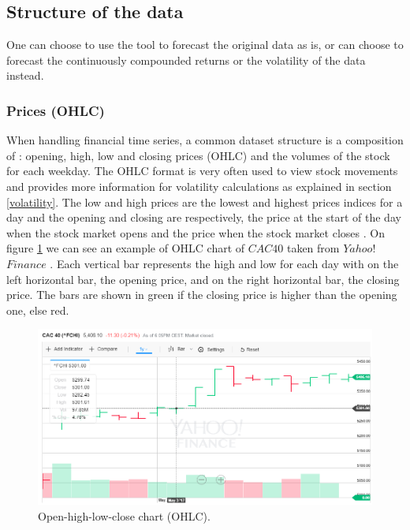 \documentclass[11pt,a4paper,oneside]{book}
\begin{document}
\subsection{Structure of the data}

One can choose to use the tool to forecast the original data as is, or can choose to forecast the continuously compounded returns or the volatility of the data instead.


\subsubsection{Prices (OHLC)}\label{OHLC}

When handling financial time series, a common dataset structure is a composition of : opening, high, low and closing prices (OHLC) and the volumes of the stock for each weekday. The OHLC format is very often used to view stock movements and provides more information for volatility calculations as explained in section \ref{volatility}. The low and high prices are the lowest and highest prices indices for a day and the opening and closing are respectively, the price at the start of the day when the stock market opens and the price when the stock market closes \cite{garm}. On figure \ref{fig:ohlc} we can see an example of OHLC chart of $CAC 40$ taken from $Yahoo!$ $Finance$ \cite{yahoo}. Each vertical bar represents the high and low for each day with on the left horizontal bar, the opening price, and on the right horizontal bar, the closing price. The bars are shown in green if the closing price is higher than the opening one, else red. 


\begin{figure}[ht]
  \centering
    \includegraphics[scale=0.55]{img/ohlc.png}
  \caption{Open-high-low-close chart (OHLC).  \cite{yahoo}}
  \label{fig:ohlc}
\end{figure}
\end{document}
